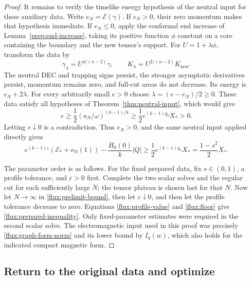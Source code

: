\begin{proof}
It remains to verify the timelike energy hypothesis of the neutral input
for these auxiliary data.  Write $e_N=\mathcal E(\gamma)$.  If $e_N>0$,
their zero momentum makes that hypothesis immediate.  If $e_N\leq0$,
apply the conformal end increase of Lemma~\ref{prep:end-increase}, taking
its positive function $\phi$ constant on a core containing the boundary
and the new tensor's support.  For $U=1+\lambda\phi$, transform the data by
\begin{equation}
 \gamma_\lambda=U^{4/(n-2)}\gamma,
 \qquad K_\lambda=U^{2/(n-2)}K_{\mathrm{new}}.
 \label{flux:neutral-end-increase}
\end{equation}
The neutral DEC and trapping signs persist, the stronger asymptotic
derivatives persist, momentum remains zero, and full-cut areas do not
decrease.  Its energy is $e_N+2\lambda$.  For every arbitrarily small
$e>0$ choose $\lambda=(e-e_N)/2\geq0$.  These data satisfy all hypotheses
of Theorem~\ref{thm:neutral-input}, which would give
\begin{equation}
 e\geq\frac12(a_N/\omega)^{(k-1)/k}
 \geq\frac12e^{(k-1)y_0}X_*>0.
 \label{flux:nonpositive-contradiction}
\end{equation}
Letting $e\downarrow0$ is a contradiction.  Thus $e_N>0$, and the same
neutral input applied directly gives
\begin{equation}
 e^{(k-1)\varepsilon}(\mathcal E_*+o_N(1))
 -\frac{H_0(0)}k|Q|
 \geq\frac12 e^{(k-1)y_0}X_*
 =\frac{1-s^2}{2}X_*.
 \label{flux:prelimit-bound}
\end{equation}

The parameter order is as follows.  For the fixed prepared data, fix
$s\in(0,1)$, a profile tolerance, and $\varepsilon>0$ first.  Complete the
two scalar solves and the regular cut for each sufficiently large $N$;
the tensor plateau is chosen last for that $N$.  Now let $N\to\infty$ in
\eqref{flux:prelimit-bound}, then let $\varepsilon\downarrow0$, and then
let the profile tolerance decrease to zero.  Equations
\eqref{flux:profile-value} and \eqref{flux:floor} give
\eqref{flux:prepared-inequality}.  Only fixed-parameter estimates were
required in the second scalar solve.  The electromagnetic input used in
this proof was precisely \eqref{flux:graph-form-norm} and its lower bound
by $I_g(w)$, which also holds for the indicated compact magnetic form.
\end{proof}

\subsection{Return to the original data and optimize}

